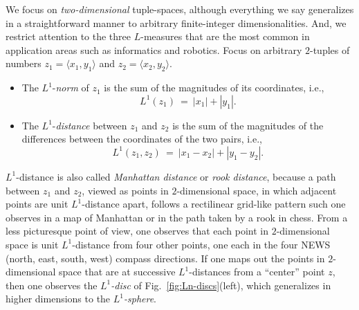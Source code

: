 We focus on {\em two-dimensional} tuple-spaces, although everything we
say generalizes in a straightforward manner to arbitrary
finite-integer dimensionalities.  And, we restrict attention to the
three $L$-measures that are the most common in application areas such
as informatics and robotics.  Focus on arbitrary $2$-tuples of numbers
$z_1 = \langle x_1, y_1 \rangle$ and $z_2 = \langle x_2, y_2 \rangle$.

\medskip

 
\begin{itemize}
\item
The $L^1$-{\it norm}  of $z_1$ is the sum of
the magnitudes of its coordinates, i.e.,
\[ L^1(z_1) \ = \ |x_1| + |y_1|.  \]  

\item
The $L^1$-{\it distance}  between $z_1$
and $z_2$ is the sum of the magnitudes of the differences between the
coordinates of the two pairs, i.e.,
\[ L^1(z_1, z_2) \ = \ |x_1 - x_2| + |y_1 - y_2|. \]
\end{itemize}
$L^1$-distance is also called {\it Manhattan distance}
 or {\it rook distance},
 because a path between $z_1$ and $z_2$, viewed
as points in $2$-dimensional space, in which adjacent points are unit
$L^1$-distance apart, follows a rectilinear grid-like pattern such one
observes in a map of Manhattan or in the path taken by a rook in
chess.  From a less picturesque point of view, one observes that each
point in $2$-dimensional space is unit $L^1$-distance from four other
points, one each in the four NEWS (north, east, south, west) compass
directions.  If one maps out the points in $2$-dimensional space that
are at successive $L^1$-distances from a ``center'' point $z$, then
one observes the {\it $L^1$-disc}  of
Fig.~\ref{fig:Ln-discs}(left), which generalizes in higher dimensions
to the {\it $L^1$-sphere}. 
